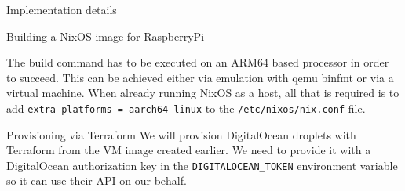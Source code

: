 \begin{frame}[fragile]{Implementation details}
\begin{block}{Building a NixOS image for RaspberryPi}
\begin{Shaded}
\begin{Highlighting}[]
   \OperatorTok{=}\OperatorTok{\{} \OperatorTok{,} \OperatorTok{,}  \OperatorTok{\}}\NormalTok{:}
       \OperatorTok{=} \OperatorTok{(}  \OperatorTok{\{} \OperatorTok{;}  \OperatorTok{=} \OperatorTok{;} \OperatorTok{\});}

       \OperatorTok{=} \OperatorTok{\{}
         \OperatorTok{=} \OperatorTok{;}
      \OperatorTok{\};}
    \OperatorTok{\{}
         \OperatorTok{=} \OperatorTok{(}\OperatorTok{(\{} \OperatorTok{,}  \OperatorTok{\}}\NormalTok{: }\OperatorTok{\{}
             \OperatorTok{=} \OperatorTok{;}
             \OperatorTok{=} \OperatorTok{[}
              \OperatorTok{(}\SpecialCharTok{$\{}\SpecialCharTok{\}}\OperatorTok{)}
            \OperatorTok{];}
            
             \OperatorTok{=} \OperatorTok{[}
            \OperatorTok{];}
        \OperatorTok{\}))}\OperatorTok{;}
    \OperatorTok{\};}
\OperatorTok{\}}
\end{Highlighting}
\end{Shaded}

The build command has to be executed on an ARM64 based processor in
order to succeed. This can be achieved either via emulation with qemu
binfmt or via a virtual machine. When already running NixOS as a host,
all that is required is to add
\texttt{extra-platforms\ =\ aarch64-linux} to the
\texttt{/etc/nixos/nix.conf} file.
\end{block}

\begin{block}{Provisioning via Terraform}
\protect\hypertarget{provisioning-via-terraform}{}
We will provision DigitalOcean droplets with Terraform from the VM image
created earlier. We need to provide it with a DigitalOcean authorization
key in the \texttt{DIGITALOCEAN\_TOKEN} environment variable so it can
use their API on our behalf.


\end{block}
\end{frame}
